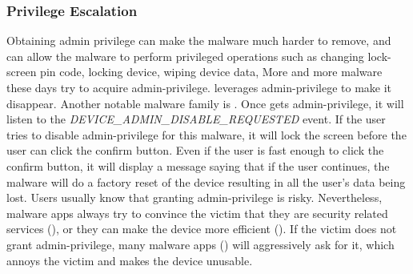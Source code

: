 %
%
%
%
%
%

\subsubsection{Privilege Escalation}
\label{sec:profile:behavior:privilege}

Obtaining admin privilege can make the malware much
harder to remove, and can allow the malware to perform privileged
operations such as changing lock-screen pin code, locking device, 
wiping device data, \etc More and more malware
these days try to acquire admin-privilege.
 leverages admin-privilege
to make it disappear.
Another notable malware family is .
Once  gets admin-privilege, it will listen to the 
{\em DEVICE_ADMIN_DISABLE_REQUESTED} event.
If the user tries to 
disable admin-privilege for this malware, it will lock the screen 
before the user can click the confirm button. Even if the user is 
fast enough to click the confirm button, it will display a message 
saying that if the user continues, the malware will do a factory 
reset of the device resulting in all the user's data being lost.
Users usually know that granting admin-privilege is risky.
Nevertheless, malware apps always try to convince the victim that 
they are security related services (\eg \mbox{}), or they 
can make the device more efficient (\eg {}).
If the victim does not grant admin-privilege, many malware apps 
(\eg {}) will aggressively ask for it, 
which annoys the victim and makes the device unusable.

